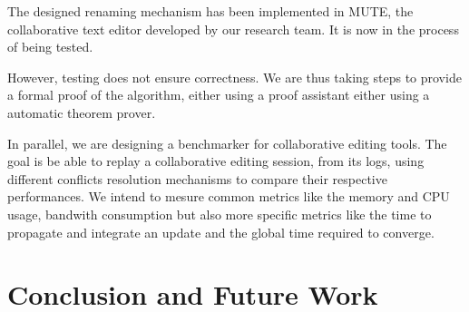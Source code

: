 \documentclass[sigplan]{acmart}
\begin{document}
The designed renaming mechanism has been implemented in MUTE, the collaborative text editor developed by our research team.
It is now in the process of being tested.

However, testing does not ensure correctness.
We are thus taking steps to provide a formal proof of the algorithm, either using a proof assistant either using a automatic theorem prover.


In parallel, we are designing a benchmarker for collaborative editing tools.
The goal is be able to replay a collaborative editing session, from its logs, using different conflicts resolution mechanisms to compare their respective performances.
We intend to mesure common metrics like the memory and CPU usage, bandwith consumption but also more specific metrics like the time to propagate and integrate an update and the global time required to converge.

\section{Conclusion and Future Work}







\end{document}
